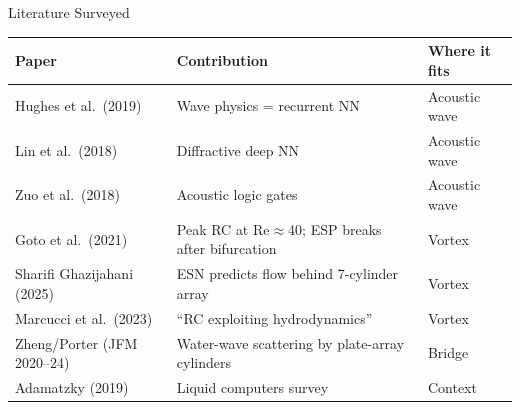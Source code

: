 \documentclass[aspectratio=169,11pt]{beamer}
\begin{document}
\begin{frame}{Literature Surveyed}
  \footnotesize
  \begin{table}
    \centering
    \renewcommand{\arraystretch}{1.1}
    \begin{tabular}{@{}>{\raggedright}p{3.2cm}>{\raggedright}p{5.5cm}>{\raggedright\arraybackslash}p{4.8cm}@{}}
      \toprule
      \textbf{Paper} & \textbf{Contribution} & \textbf{Where it fits} \\
      \midrule
      Hughes et al.\ (2019) & Wave physics = recurrent NN & Acoustic wave \\
      Lin et al.\ (2018) & Diffractive deep NN & Acoustic wave \\
      Zuo et al.\ (2018) & Acoustic logic gates & Acoustic wave \\
      \midrule
      Goto et al.\ (2021) & Peak RC at Re$\approx$40; ESP breaks after bifurcation & Vortex \\
      Sharifi Ghazijahani (2025) & ESN predicts flow behind 7-cylinder array & Vortex \\
      Marcucci et al.\ (2023) & ``RC exploiting hydrodynamics'' & Vortex \\
      \midrule
      Zheng/Porter (JFM 2020--24) & Water-wave scattering by plate-array cylinders & Bridge \\
      Adamatzky (2019) & Liquid computers survey & Context \\
      \bottomrule
    \end{tabular}
  \end{table}
\end{frame}
\end{document}
